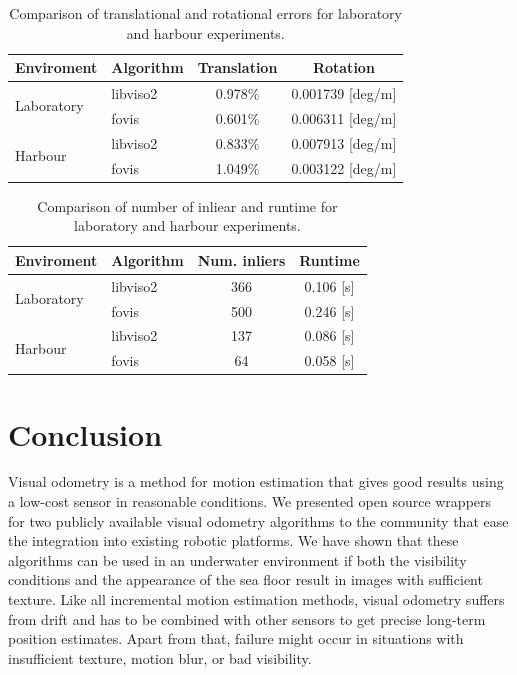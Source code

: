 \documentclass[conference]{IEEEtran}
\begin{document}
\begin{table}[!t]
  \renewcommand{\arraystretch}{1.3}
  \caption{Comparison of translational and rotational errors for laboratory and harbour experiments.}
  \label{results-errors}
  \centering
  \begin{tabular}{|l|l|c|c|} \hline
    \textbf{Enviroment} & \textbf{Algorithm} & \textbf{Translation} & \textbf{Rotation}\\ \hline
    \multirow{2}{*}{Laboratory} & libviso2 & 0.978\% & 0.001739 [deg/m] \\
                                & fovis    & 0.601\% & 0.006311 [deg/m] \\ \hline
    \multirow{2}{*}{Harbour}    & libviso2 & 0.833\% & 0.007913 [deg/m] \\
                                & fovis    & 1.049\% & 0.003122 [deg/m] \\ \hline
  \end{tabular} 
\end{table}

\begin{table}[!t]
  \renewcommand{\arraystretch}{1.3}
  \caption{Comparison of number of inliear and runtime for laboratory and harbour experiments.}
  \label{results-runtime}
  \centering
  \begin{tabular}{|l|l|c|c|} \hline
    \textbf{Enviroment} & \textbf{Algorithm} & \textbf{Num. inliers} & \textbf{Runtime}\\ \hline
    \multirow{2}{*}{Laboratory} & libviso2 & 366 & 0.106 [s] \\
                                & fovis    & 500 & 0.246 [s] \\ \hline
    \multirow{2}{*}{Harbour}    & libviso2 & 137 & 0.086 [s] \\
                                & fovis    & 64 & 0.058 [s] \\ \hline
  \end{tabular} 
\end{table}

\section{Conclusion
  \label{conclusion}
}

Visual odometry is a method for motion estimation that gives good results using a low-cost sensor in reasonable conditions. We presented open source wrappers for two publicly available visual odometry algorithms to the community that ease the integration into existing robotic platforms.
We have shown that these algorithms can be used in an underwater environment if both the visibility conditions and the appearance of the sea floor result in images with sufficient texture. Like all incremental motion estimation methods, visual odometry suffers from drift and has to be combined with other sensors to get precise long-term position estimates. Apart from that, failure might occur in situations with insufficient texture, motion blur, or bad visibility.
\end{document}
